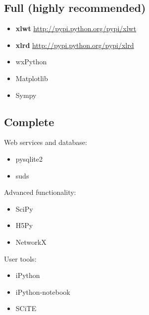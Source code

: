 \documentclass[a4paper,11pt,english]{sphinxmanual}
\begin{document}
\subsection{Full (highly recommended)}
\label{install_doc:full-highly-recommended}\begin{itemize}
\item {} 
\textbf{xlwt} \href{http://pypi.python.org/pypi/xlwt}{http://pypi.python.org/pypi/xlwt}

\item {} 
\textbf{xlrd} \href{http://pypi.python.org/pypi/xlrd}{http://pypi.python.org/pypi/xlrd}

\item {} 
wxPython

\item {} 
Matplotlib

\item {} 
Sympy

\end{itemize}


\subsection{Complete}
\label{install_doc:complete}
Web services and database:
\begin{itemize}
\item {} 
pysqlite2

\item {} 
suds

\end{itemize}

Advanced functionality:
\begin{itemize}
\item {} 
SciPy

\item {} 
H5Py

\item {} 
NetworkX

\end{itemize}

User tools:
\begin{itemize}
\item {} 
iPython

\item {} 
iPython-notebook

\item {} 
SCiTE

\end{itemize}
\end{document}
